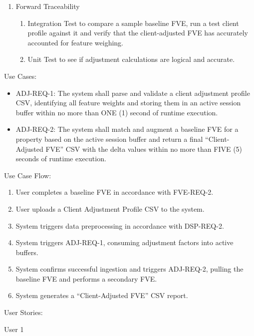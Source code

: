 \documentclass[
]{article}
\begin{document}
\begin{enumerate}
\def\labelenumi{\alph{enumi}.}
\item
  Forward Traceability

  \begin{enumerate}
  \def\labelenumii{\roman{enumii}.}
  \item
    Integration Test to compare a sample baseline FVE, run a test client
    profile against it and verify that the client-adjusted FVE has
    accurately accounted for feature weighing.
  \item
    Unit Test to see if adjustment calculations are logical and
    accurate.
  \end{enumerate}
\end{enumerate}

Use Cases:

\begin{itemize}
\item
  ADJ-REQ-1: The system shall parse and validate a client adjustment
  profile CSV, identifying all feature weights and storing them in an
  active session buffer within no more than ONE (1) second of runtime
  execution.
\item
  ADJ-REQ-2: The system shall match and augment a baseline FVE for a
  property based on the active session buffer and return a final
  ``Client-Adjusted FVE'' CSV with the delta values within no more than
  FIVE (5) seconds of runtime execution.
\end{itemize}

Use Case Flow:

\begin{enumerate}
\def\labelenumi{\arabic{enumi}.}
\item
  User completes a baseline FVE in accordance with FVE-REQ-2.
\item
  User uploads a Client Adjustment Profile CSV to the system.
\item
  System triggers data preprocessing in accordance with DSP-REQ-2.
\item
  System triggers ADJ-REQ-1, consuming adjustment factors into active
  buffers.
\item
  System confirms successful ingestion and triggers ADJ-REQ-2, pulling
  the baseline FVE and performs a secondary FVE.
\item
  System generates a ``Client-Adjusted FVE'' CSV report.
\end{enumerate}

User Stories:

User 1
\end{document}

